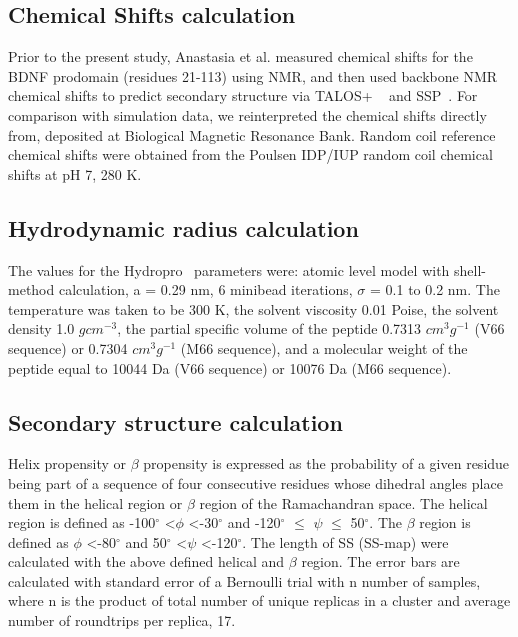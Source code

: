 \documentclass[10pt,letterpaper]{article}
\begin{document}
\subsection*{Chemical Shifts calculation} Prior to the present study, Anastasia et al.\cite{Anastasia2013} measured chemical shifts for the BDNF prodomain (residues 21-113) using NMR, and then used backbone NMR chemical shifts to predict secondary structure via TALOS+ ~\cite{Shen2009} and SSP~\cite{Marsh2006a}. For comparison with simulation data, we reinterpreted the chemical shifts directly from\cite{Anastasia2013}, deposited at Biological Magnetic Resonance Bank. Random coil reference chemical shifts were obtained from the Poulsen IDP/IUP random coil chemical shifts\cite{Schwarzinger2001,Kjaergaard2011b,Kjaergaard2011a} at pH 7, 280 K.

\subsection*{Hydrodynamic radius calculation} 
The values for the Hydropro~\cite{Ortega2011} parameters were: atomic level model with shell-method calculation, a = 0.29 nm, 6 minibead iterations, $\sigma$ = 0.1 to 0.2 nm. The temperature was taken to be 300 K, the solvent viscosity 0.01 Poise, the solvent density 1.0 $gcm^\mathrm{-3}$, the partial specific volume of the peptide 0.7313 $cm^\mathrm{3}g^\mathrm{-1}$ (V66 sequence) or 0.7304 $cm^\mathrm{3}g^\mathrm{-1}$ (M66 sequence), and a molecular weight of the peptide equal to 10044 Da (V66 sequence) or 10076 Da (M66 sequence).

\subsection*{Secondary structure calculation} Helix propensity or $\beta$ propensity is expressed as the probability of a given residue being part of a sequence of four consecutive residues whose dihedral angles place them in the helical region or $\beta$ region of the Ramachandran space. The helical region is defined as -100$^{\circ}$ \textless $\phi$ \textless -30$^{\circ}$ and -120$^{\circ}$ $\leq$ $\psi$ $\leq$ 50$^{\circ}$\cite{Nodet,Garcia2002,Knott2012b}. The $\beta$ region is defined as $\phi$ \textless -80$^{\circ}$ and 50$^{\circ}$ \textless $\psi$ \textless -120$^{\circ}$. The length of SS (SS-map)\cite{Iglesias2013} were calculated with the above defined helical and $\beta$ region. The error bars are calculated with standard error of a Bernoulli trial with n number of samples, where n is the product of total number of unique replicas in a cluster and average number of roundtrips per replica, 17.
\end{document}
